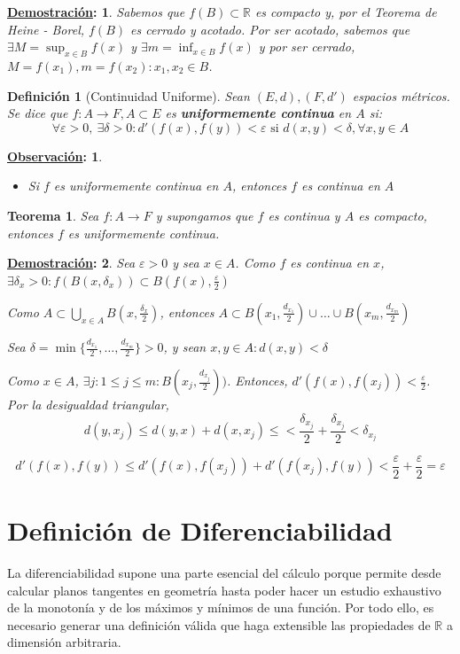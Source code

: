 \documentclass[10pt,a4paper,openright]{book}
\theoremstyle{break}
\newtheorem*{defi}{Definición}
\newtheorem*{theo}{Teorema}
\newtheorem*{demo}{\underline{Demostración}:}
\newtheorem*{obs}{\underline{Observación}:}
\begin{document}
\begin{demo}
Sabemos que $f(B) \subset \mathbb{R}$ es compacto y, por el Teorema de Heine - Borel, $f(B)$ es cerrado y acotado. Por ser acotado, sabemos que $\exists M = \sup_{x \in B} f(x)$ y $\exists m = \inf_{x \in B} f(x)$ y por ser cerrado, $M = f(x_1), m = f(x_2) : x_1, x_2 \in B$.
\end{demo}

\begin{defi}[Continuidad Uniforme]
Sean $(E,d), (F, d')$ espacios métricos. Se dice que $f: A \to F, A \subset E$ es \textbf{uniformemente continua} en $A$ si:
$$\forall \varepsilon > 0, \ \exists \delta > 0 : d'(f(x), f(y)) < \varepsilon \mbox{ si } d(x,y) < \delta, \forall x,y \in A$$
\end{defi}

\begin{obs}
\begin{itemize}
\item Si $f$ es uniformemente continua en $A$, entonces $f$ es continua en $A$
\end{itemize}
\end{obs}

\begin{theo}
Sea $f: A \to F$ y supongamos que $f$ es continua y $A$ es compacto, entonces $f$ es uniformemente continua.
\end{theo}
\begin{demo}
Sea $\varepsilon > 0$ y sea $x \in A$. Como $f$ es continua en $x$, $\exists \delta_x > 0 : f(B(x, \delta_x)) \subset B(f(x), \frac{\varepsilon}{2})$

Como $A \subset \bigcup_{x \in A} B(x, \frac{\delta_x}{2})$, entonces $A \subset B(x_1, \frac{d_{x_1}}{2}) \cup \ldots \cup B(x_m,  \frac{d_{x_m}}{2})$

Sea $\delta = \min\{ \frac{d_{x_1}}{2}, \ldots,  \frac{d_{x_m}}{2}\} > 0$, y sean $x,y \in A : d(x,y) < \delta$

Como $x\in A$, $\exists j : 1 \leq j \leq m : B(x_j,  \frac{d_{x_j}}{2}))$. Entonces, $d'(f(x), f(x_j)) < \frac{\varepsilon}{2}$. Por la desigualdad triangular, $$d(y,x_j) \leq d(y,x) + d(x,x_j) \leq < \frac{\delta _{x_j}}{2} + \frac{\delta _{x_j}}{2} < \delta _{x_j}$$

$$d'(f(x), f(y)) \leq d'(f(x), f(x_j)) + d'(f(x_j), f(y)) < \frac{\varepsilon}{2} + \frac{\varepsilon}{2} = \varepsilon$$
\end{demo}

\section{Definición de Diferenciabilidad}
La diferenciabilidad supone una parte esencial del cálculo porque permite desde calcular planos tangentes en geometría hasta poder hacer un estudio exhaustivo de la monotonía y de los máximos y mínimos de una función. Por todo ello, es necesario generar una definición válida que haga extensible las propiedades de $\mathbb{R}$ a dimensión arbitraria.
\end{document}
